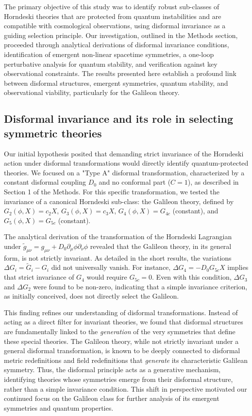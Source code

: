 \documentclass[twocolumn]{aastex631}
\begin{document}
The primary objective of this study was to identify robust sub-classes of Horndeski theories that are protected from quantum instabilities and are compatible with cosmological observations, using disformal invariance as a guiding selection principle. Our investigation, outlined in the Methods section, proceeded through analytical derivations of disformal invariance conditions, identification of emergent non-linear spacetime symmetries, a one-loop perturbative analysis for quantum stability, and verification against key observational constraints. The results presented here establish a profound link between disformal structures, emergent symmetries, quantum stability, and observational viability, particularly for the Galileon theory.

\subsection{Disformal invariance and its role in selecting symmetric theories}
Our initial hypothesis posited that demanding strict invariance of the Horndeski action under disformal transformations would directly identify quantum-protected theories. We focused on a "Type A" disformal transformation, characterized by a constant disformal coupling $D_0$ and no conformal part ($C=1$), as described in Section 1 of the Methods. For this specific transformation, we tested the invariance of a canonical Horndeski sub-class: the Galileon theory, defined by $G_2(\phi, X) = c_2 X$, $G_3(\phi, X) = c_3 X$, $G_4(\phi, X) = G_{4c}$ (constant), and $G_5(\phi, X) = G_{5c}$ (constant).

The analytical derivation of the transformation of the Horndeski Lagrangian under $\tilde{g}_{\mu\nu} = g_{\mu\nu} + D_0 \partial_\mu \phi \partial_\nu \phi$ revealed that the Galileon theory, in its general form, is not strictly invariant. As detailed in the short results, the variations $\Delta G_i = \tilde{G}_i - G_i$ did not universally vanish. For instance, $\Delta G_4 = -D_0 G_{5c} X$ implies that strict invariance of $G_4$ would require $G_{5c}=0$. Even with this condition, $\Delta G_3$ and $\Delta G_2$ were found to be non-zero, indicating that a simple invariance criterion, as initially conceived, does not directly select the Galileon.

This finding refines our understanding of disformal transformations. Instead of acting as a direct filter for invariant theories, we found that disformal structures are fundamentally linked to the \textit{generation} of the very symmetries that define these special theories. The Galileon theory, while not strictly invariant under a general disformal transformation, is known to be deeply connected to disformal metric redefinitions and field redefinitions that \textit{generate} its characteristic Galilean symmetry. Thus, the disformal principle acts as a generative mechanism, identifying theories whose symmetries emerge from their disformal structure, rather than a simple invariance condition. This shift in perspective motivated our continued focus on the Galileon class for further analysis of its emergent symmetries and quantum properties.
\end{document}
